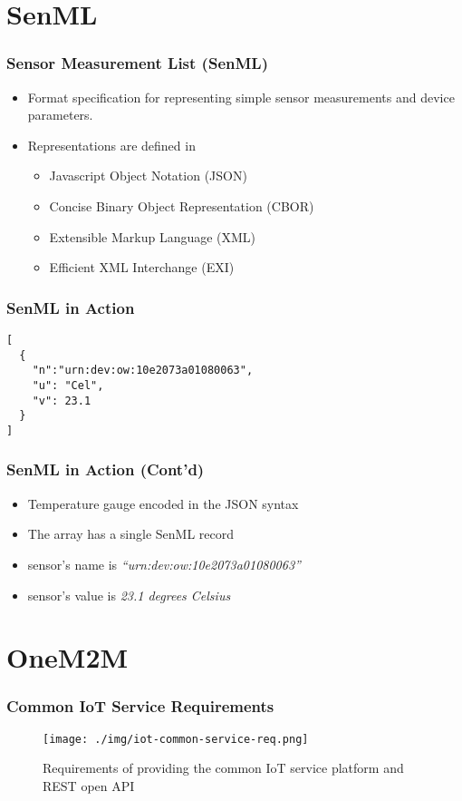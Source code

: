 \documentclass{../iot-lecture}
\begin{document}
\section{SenML}

\begin{frame}
  \frametitle{Sensor Measurement List (SenML)}
  \begin{itemize}
    \item Format specification for representing simple sensor measurements and device parameters.
    \item Representations are defined in
    \begin{itemize}
      \item Javascript Object Notation (JSON)
      \item Concise Binary Object Representation (CBOR)
      \item Extensible Markup Language (XML)
      \item Efficient XML Interchange (EXI)
    \end{itemize}
  \end{itemize}
\end{frame}

\begin{frame}[fragile]
  \frametitle{SenML in Action}
  \begin{verbatim}
[
  {
    "n":"urn:dev:ow:10e2073a01080063",
    "u": "Cel",
    "v": 23.1
  }
]
  \end{verbatim}
\end{frame}

\begin{frame}
  \frametitle{SenML in Action (Cont'd)}
  \begin{itemize}
    \item Temperature gauge encoded in the JSON syntax
    \item The array has a single SenML record
    \item sensor's name is \textit{``urn:dev:ow:10e2073a01080063''}
    \item sensor's value is \textit{23.1 degrees Celsius}
  \end{itemize}
\end{frame}

\section{OneM2M}

\begin{frame}
  \frametitle{Common IoT Service Requirements}
  \begin{figure}
    \texttt{[image: ./img/iot-common-service-req.png]}
    \caption{\scriptsize Requirements of providing the common IoT service platform and REST open API\~\cite{Kim2016}}
  \end{figure}
\end{frame}
\end{document}
